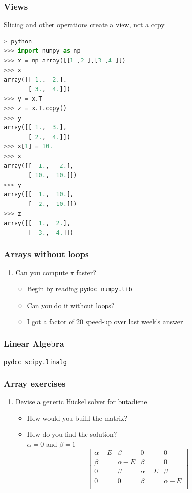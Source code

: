 \documentclass[xcolor=table,10pt,final]{beamer}
\begin{document}
\begin{frame}[fragile]
  \frametitle{Views}
  Slicing and other operations create a view, not a copy
\begin{lstlisting}[language=python]
> python
>>> import numpy as np
>>> x = np.array([[1.,2.],[3.,4.]])
>>> x
array([[ 1.,  2.],
       [ 3.,  4.]])
>>> y = x.T
>>> z = x.T.copy()
>>> y
array([[ 1.,  3.],
       [ 2.,  4.]])
>>> x[1] = 10.
>>> x
array([[  1.,   2.],
       [ 10.,  10.]])
>>> y
array([[  1.,  10.],
       [  2.,  10.]])
>>> z
array([[  1.,  2.],
       [  3.,  4.]])
\end{lstlisting}
\end{frame}

\begin{frame}[fragile]
  \frametitle{Arrays without loops}
  \begin{enumerate}
    \item Can you compute $\pi$ faster?
      \begin{itemize}
        \item Begin by reading {\tt pydoc numpy.lib}
        \item Can you do it without loops?
        \item I got a factor of 20 speed-up over last week's answer
      \end{itemize}
  \end{enumerate}
\end{frame}

\begin{frame}[fragile]
  \frametitle{Linear Algebra}
  {\tt pydoc scipy.linalg}
\end{frame}

\begin{frame}[fragile]
  \frametitle{Array exercises}
  \begin{enumerate}
    \item Devise a generic H\"{u}ckel solver for butadiene
      \begin{itemize}
        \item How would you build the matrix?
        \item How do you find the solution?\\
          $\alpha=0$ and $\beta = 1$\\
          \begin{equation*}
            \begin{bmatrix}
              \alpha - E & \beta & 0 & 0\\
              \beta & \alpha - E & \beta & 0\\
              0 & \beta & \alpha -E & \beta\\
              0 & 0 & \beta & \alpha -E\\
            \end{bmatrix}
          \end{equation*}
      \end{itemize}
  \end{enumerate}
\end{frame}
\end{document}
